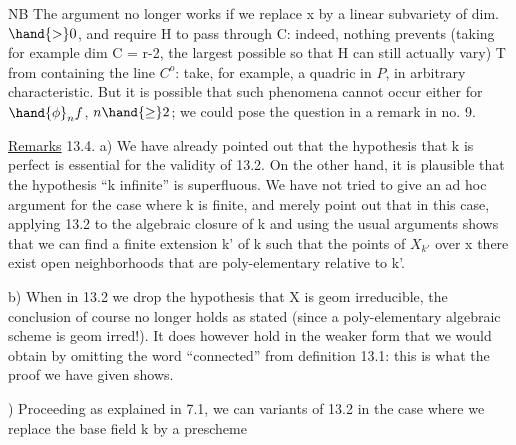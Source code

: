 
NB \quad The argument no longer works if we replace x by a
linear subvariety  of dim.$\hand{>}0$, and require H to pass
through C: indeed, nothing prevents (taking for example dim C = r-2, the
largest possible so that H can still actually vary)
T from containing the line $C^{o}$:
 take, for
example, a  quadric in $P$, in arbitrary characteristic. But it
is possible that such phenomena cannot occur either 
for $\hand{\phi}_n f$, $n\hand{\geq} 2$; we could pose the question in a remark in
no. 9.

\uline{Remarks} 13.4. \quad a) We have already pointed out that the hypothesis that k 
is perfect is essential for the validity of 13.2. On the other hand, it
is plausible that the hypothesis “k infinite” is superfluous. 
We have not tried  to give an ad hoc argument for the case
where k is finite, and merely point out that in this case, applying
13.2 to the algebraic closure of k and using the usual arguments
shows that we can find a finite extension k' of k such that
  the points of $X_{k'}$ over x there exist open neighborhoods
that are poly-elementary relative to k'.

b) When in 13.2 we drop the hypothesis that X is geom
irreducible, the conclusion of course no longer holds as stated
(since a poly-elementary algebraic scheme is geom irred!). It
does however hold in the weaker form that we would obtain by
omitting the word “connected” from definition 13.1: this is what
the proof we have given shows.

) Proceeding as explained in 7.1, we can  variants
of 13.2 in the case where we replace the base field k by a prescheme
